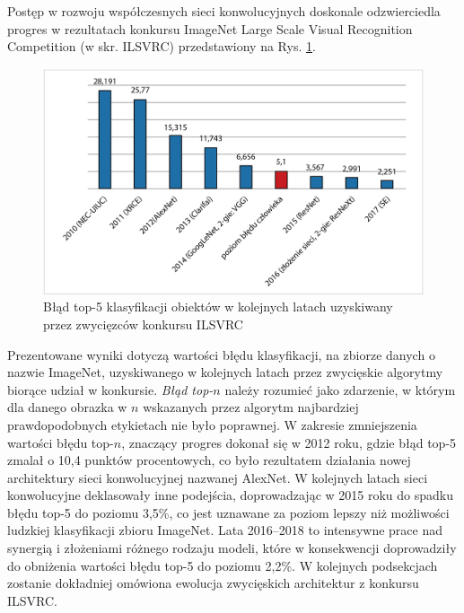 Postęp w rozwoju współczesnych sieci konwolucyjnych doskonale odzwierciedla progres w rezultatach konkursu ImageNet Large Scale Visual Recognition Competition (w skr. ILSVRC) przedstawiony na Rys. \ref{ILSVRC}.
\begin{figure}[h!]
	\centering
	\includegraphics[width=1\textwidth]{figures/ILSVRC.jpg}
	\caption{Błąd top-5 klasyfikacji obiektów w kolejnych latach uzyskiwany przez zwycięzców konkursu ILSVRC}
	\label{ILSVRC}
\end{figure}
Prezentowane wyniki dotyczą wartości błędu klasyfikacji, na zbiorze danych \cite{imagenet_cvpr09} o nazwie ImageNet, uzyskiwanego w kolejnych latach przez zwycięskie algorytmy biorące udział w konkursie. \textit{Błąd top-$n$} należy rozumieć jako zdarzenie, w którym dla danego obrazka w $n$ wskazanych przez algorytm najbardziej prawdopodobnych etykietach nie było poprawnej. W zakresie zmniejszenia wartości błędu top-$n$, znaczący progres dokonał się w 2012 roku, gdzie błąd top-5 zmalał o 10,4 punktów procentowych, co było rezultatem działania nowej architektury sieci konwolucyjnej nazwanej AlexNet. W kolejnych latach sieci konwolucyjne deklasowały inne podejścia, doprowadzając w 2015 roku do spadku błędu top-5 do poziomu 3,5\%, co jest uznawane za poziom lepszy niż możliwości ludzkiej klasyfikacji zbioru ImageNet. Lata 2016--2018 to intensywne prace nad synergią i złożeniami różnego rodzaju modeli, które w konsekwencji doprowadziły do obniżenia wartości błędu top-5 do poziomu 2,2\%. W kolejnych podsekcjach zostanie dokładniej omówiona ewolucja zwycięskich architektur z konkursu ILSVRC. 

